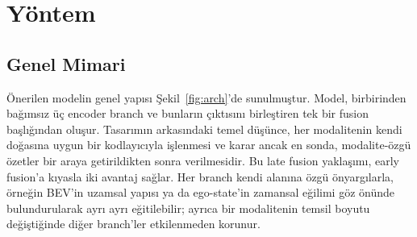 \documentclass[conference]{IEEEtran}
\begin{document}
\begin{table}[!t]
\caption{End-to-end CARLA yöntemlerinin girdi, çıktı ve backbone özeti}
\label{tab:related}
\centering
\footnotesize
\renewcommand{\arraystretch}{1.1}
\end{table}

\section{Yöntem}

\subsection{Genel Mimari}

Önerilen modelin genel yapısı Şekil~\ref{fig:arch}'de sunulmuştur. Model, birbirinden bağımsız üç encoder branch ve bunların çıktısını birleştiren tek bir fusion başlığından oluşur. Tasarımın arkasındaki temel düşünce, her modalitenin kendi doğasına uygun bir kodlayıcıyla işlenmesi ve karar ancak en sonda, modalite-özgü özetler bir araya getirildikten sonra verilmesidir. Bu late fusion yaklaşımı, early  fusion'a kıyasla iki avantaj sağlar. Her branch kendi alanına özgü önyargılarla, örneğin BEV'in uzamsal yapısı ya da ego-state'in zamansal eğilimi göz önünde bulundurularak ayrı ayrı eğitilebilir; ayrıca bir modalitenin temsil boyutu değiştiğinde diğer branch'ler etkilenmeden korunur.
\end{document}
